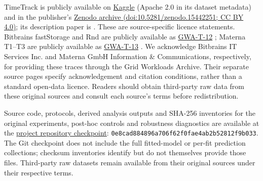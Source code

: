 \documentclass[5p,twocolumn]{elsarticle}
\begin{document}
TimeTrack is publicly available on
\href{https://www.kaggle.com/datasets/abdelghanimeliani/open-air-interface-cicd-timeseries-dataset}{Kaggle}
(Apache 2.0 in its dataset metadata) and in the publisher's
\href{https://doi.org/10.5281/zenodo.15442251}{Zenodo archive
(doi:10.5281/zenodo.15442251; CC BY 4.0)}; its description paper is
\citet{Meliani2025TimeTrack}. These are source-specific licence statements.
Bitbrains fastStorage and Rnd are publicly available as
\href{https://atlarge-research.com/gwa-t-12/}{GWA-T-12}
\citep{Shen2015Bitbrains}; Materna T1--T3 are publicly available as
\href{https://atlarge-research.com/gwa-t-13/}{GWA-T-13}
\citep{Kohne2014FederatedCloudSim,Kohne2016SLAScheduling}.
We acknowledge Bitbrains IT Services Inc. and Materna GmbH Information
\& Communications, respectively, for providing these traces through the
Grid Workloads Archive. Their separate source pages specify acknowledgement
and citation conditions, rather than a standard open-data licence. Readers
should obtain third-party raw data from these original sources and consult
each source's terms before redistribution.

Source code, protocols, derived analysis outputs and SHA-256 inventories for
the original experiments, post-hoc controls and robustness diagnostics are
available at the
\href{https://github.com/KADOUMAAbdelhak/TimeTrack-Forecasting-Framework/tree/0e8cad884896a706f62f0fae4ab2b52812f9b033}{project repository checkpoint}:\newline
\texttt{0e8cad884896a706f62f0fae4ab2b52812f9b033}.
The Git checkpoint does not include the full fitted-model or per-fit prediction
collections; checksum inventories identify but do not themselves provide those
files. Third-party raw datasets remain available from their original sources
under their respective terms.
\end{document}
